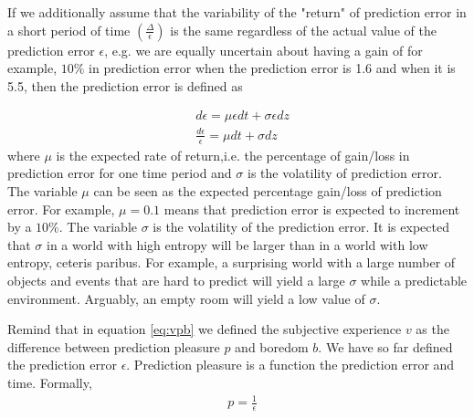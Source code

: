 \documentclass[11pt, onecolumn]{article}
\begin{document}
If we additionally assume that the variability of the "return" of prediction error in a short period of time $(\frac{\Delta}{\epsilon})$ is the same regardless of the actual value of the prediction error $\epsilon$, e.g. we are equally uncertain about having a gain of for example, $10\%$ in prediction error when the prediction error is 1.6 and when it is 5.5, then the prediction error is defined as

\begin{equation}
\begin{split}
& d \epsilon= \mu \epsilon dt + \sigma \epsilon dz \\
& \frac{d \epsilon}{\epsilon}= \mu dt + \sigma dz
\end{split}
\label{eq:wiener}
\end{equation}
where $\mu$ is the expected rate of return,i.e. the percentage of gain/loss in prediction error for one time period and $\sigma$ is the volatility of prediction error.
The variable $\mu$ can be seen as the expected percentage gain/loss of prediction error. For example, $\mu = 0.1$ means that prediction error is expected to increment by a $10\%$. The variable $\sigma$ is the volatility of the prediction error. It is expected that $\sigma$ in a world with high entropy will be larger than in a world with low entropy, ceteris paribus. For example, a surprising world with a large number of objects and events that are hard to predict will yield a large $\sigma$ while a predictable environment. Arguably, an empty room will yield a low value of $\sigma$. 

Remind that in equation \ref{eq:vpb} we defined the subjective experience $v$ as the difference between prediction pleasure $p$ and boredom $b$. We have so far defined the prediction error $\epsilon$. Prediction pleasure is a function the prediction error and time. Formally, 
\begin{equation*}
\begin{split}
& p = \frac{1}{\epsilon} \\
\end{split}
\label{eq:pinve}
\end{equation*}
\end{document}
